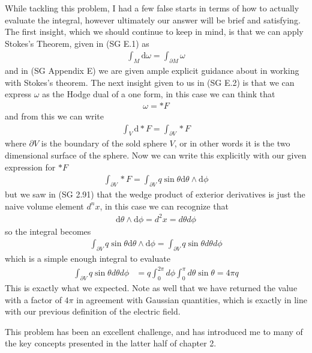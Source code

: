 While tackling this problem, I had a few false starts in terms of how to actually evaluate the integral, however ultimately our answer will be brief and satisfying. The first insight, which we should continue to keep in mind, is that we can apply Stokes's Theorem, given in (SG E.1) as 
%
\begin{align}
	\int_M \textrm{d} \omega = \int_{\partial M} \omega 
\end{align}
%
and in (SG Appendix E) we are given ample explicit guidance about in working with Stokes's theorem. The next insight given to us in (SG E.2) is that we can express $\omega$ as the Hodge dual of a one form, in this case we can think that
%
\begin{align}
	\omega = \ast F 
\end{align}
%
and from this we can write 
%
\begin{align}
	\int_V \textrm{d} \ast F = \int_{\partial V} \ast F
\end{align}
%
where $ \partial V $ is the boundary of the sold sphere $V$, or in other words it is the two dimensional surface of the sphere.  Now we can write this explicitly with our given expression for $ \ast F $
%
\begin{align}
	\int_{\partial V} \ast F = 	\int_{\partial V} q \sin{\theta} \textrm{d} \theta \wedge \textrm{d} \phi
\end{align}
%
but we saw in (SG 2.91) that the wedge product of exterior derivatives is just the naive volume element $d^n x$, in this case we can recognize that 
%
\begin{align}
	\textrm{d} \theta \wedge \textrm{d} \phi = d^2 x = d \theta d \phi
\end{align}
%
so the integral becomes
%
\begin{align}
	\int_{\partial V} q \sin{\theta} \textrm{d} \theta \wedge \textrm{d} \phi = \int_{\partial V} q \sin{\theta} d \theta d \phi
\end{align}
%
which is a simple enough integral to evaluate
%
\begin{align}
	\int_{\partial V} q \sin{\theta} d \theta d \phi &= q \int_{0}^{2 \pi} d \phi \int_{0}^{\pi} d \theta \sin{\theta} = 4 \pi q
\end{align}
% 
This is exactly what we expected. Note as well that we have returned the value with a factor of $4 \pi$ in agreement with Gaussian quantities, which is exactly in line with our previous definition of the electric field. 

This problem has been an excellent challenge, and has introduced me to many of the key concepts presented in the latter half of chapter 2. 